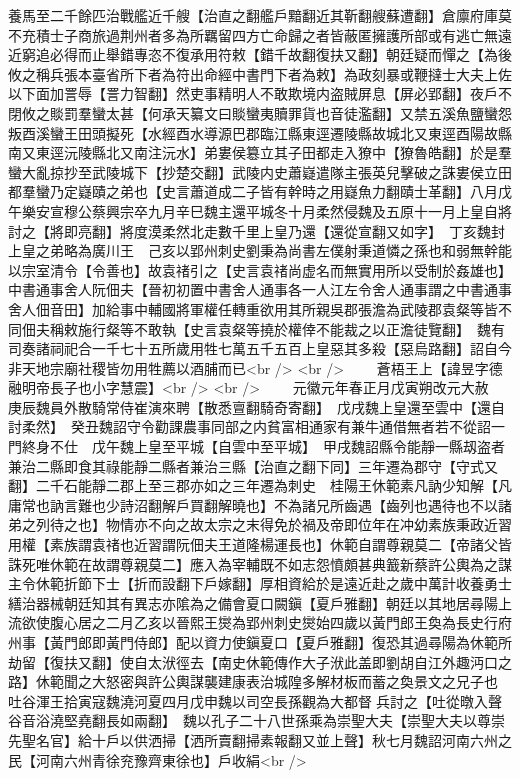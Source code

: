 養馬至二千餘匹治戰艦近千艘【治直之翻艦戶黯翻近其靳翻艘蘇遭翻】倉廪府庫莫不充積士子商旅過荆州者多為所羈留四方亡命歸之者皆蔽匿擁護所部或有逃亡無遠近窮追必得而止舉錯專恣不復承用符敕【錯千故翻復扶又翻】朝廷疑而憚之【為後攸之稱兵張本臺省所下者為符出命經中書門下者為敕】為政刻暴或鞭撻士大夫上佐以下面加詈辱【詈力智翻】然吏事精明人不敢欺境内盗賊屏息【屏必郢翻】夜戶不閉攸之賧罰羣蠻太甚【何承天纂文曰賧蠻夷贖罪貨也音徒濫翻】又禁五溪魚鹽蠻怨叛酉溪蠻王田頭擬死【水經酉水導源巴郡臨江縣東逕遷陵縣故城北又東逕酉陽故縣南又東逕沅陵縣北又南注沅水】弟婁侯簒立其子田都走入獠中【獠魯皓翻】於是羣蠻大亂掠抄至武陵城下【抄楚交翻】武陵内史蕭嶷遣隊主張英兒擊破之誅婁侯立田都羣蠻乃定嶷賾之弟也【史言蕭道成二子皆有幹時之用嶷魚力翻賾士革翻】八月戊午樂安宣穆公蔡興宗卒九月辛巳魏主還平城冬十月柔然侵魏及五原十一月上皇自將討之【將即亮翻】將度漠柔然北走數千里上皇乃還【還從宣翻又如字】　丁亥魏封上皇之弟略為廣川王　己亥以郢州刺史劉秉為尚書左僕射秉道憐之孫也和弱無幹能以宗室清令【令善也】故袁禇引之【史言袁禇尚虚名而無實用所以受制於姦雄也】　中書通事舍人阮佃夫【晉初初置中書舍人通事各一人江左令舍人通事謂之中書通事舍人佃音田】加給事中輔國將軍權任轉重欲用其所親吳郡張澹為武陵郡袁粲等皆不同佃夫稱敕施行粲等不敢執【史言袁粲等撓於權倖不能裁之以正澹徒覽翻】　魏有司奏諸祠祀合一千七十五所歲用牲七萬五千五百上皇惡其多殺【惡烏路翻】詔自今非天地宗廟社稷皆勿用牲薦以酒脯而已<br />
<br />
　　蒼梧王上【諱昱字德融明帝長子也小字慧震】<br />
<br />
　　元徽元年春正月戊寅朔改元大赦　庚辰魏員外散騎常侍崔演來聘【散悉亶翻騎奇寄翻】　戊戌魏上皇還至雲中【還自討柔然】　癸丑魏詔守令勸課農事同部之内貧富相通家有兼牛通借無者若不從詔一門終身不仕　戊午魏上皇至平城【自雲中至平城】　甲戌魏詔縣令能靜一縣刼盗者兼治二縣即食其祿能靜二縣者兼治三縣【治直之翻下同】三年遷為郡守【守式又翻】二千石能靜二郡上至三郡亦如之三年遷為刺史　桂陽王休範素凡訥少知解【凡庸常也訥言難也少詩沼翻解戶買翻解曉也】不為諸兄所齒遇【齒列也遇待也不以諸弟之列待之也】物情亦不向之故太宗之末得免於禍及帝即位年在冲幼素族秉政近習用權【素族謂袁禇也近習謂阮佃夫王道隆楊運長也】休範自謂尊親莫二【帝諸父皆誅死唯休範在故謂尊親莫二】應入為宰輔既不如志怨憤頗甚典籖新蔡許公輿為之謀主令休範折節下士【折而設翻下戶嫁翻】厚相資給於是遠近赴之歲中萬計收養勇士繕治器械朝廷知其有異志亦隂為之備會夏口闕鎭【夏戶雅翻】朝廷以其地居尋陽上流欲使腹心居之二月乙亥以晉熙王爕為郢州刺史爕始四歲以黃門郎王奐為長史行府州事【黃門郎即黃門侍郎】配以資力使鎭夏口【夏戶雅翻】復恐其過尋陽為休範所劫留【復扶又翻】使自太洑徑去【南史休範傳作大子洑此盖即劉胡自江外趣沔口之路】休範聞之大怒密與許公輿謀襲建康表治城隍多解材板而蓄之奐景文之兄子也　吐谷渾王拾寅寇魏澆河夏四月戊申魏以司空長孫觀為大都督兵討之【吐從暾入聲谷音浴澆堅堯翻長如兩翻】　魏以孔子二十八世孫乘為崇聖大夫【崇聖大夫以尊崇先聖名官】給十戶以供洒掃【洒所賣翻掃素報翻又並上聲】秋七月魏詔河南六州之民【河南六州青徐兖豫齊東徐也】戶收絹<br />
